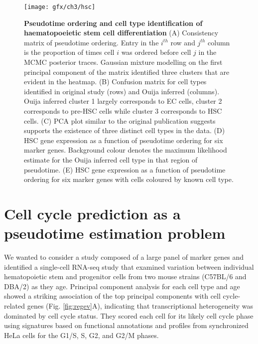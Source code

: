 \begin{figure}
	\centering
	\texttt{[image: gfx/ch3/hsc]}
	\caption{{\bf Pseudotime ordering and cell type identification of haematopoeietic stem cell differentiation}
(A) Consistency matrix of pseudotime ordering. Entry in the $i^{th}$ row and $j^{th}$ column is the proportion of times cell $i$ was ordered before cell $j$ in the MCMC posterior traces. Gaussian mixture modelling on the first principal component of the matrix identified three clusters that are evident in the heatmap.
(B) Confusion matrix for cell types identified in original study (rows) and Ouija inferred (columns). Ouija inferred cluster 1 largely corresponds to EC cells, cluster 2 corresponds to pre-HSC cells while cluster 3 corresponds to HSC cells.
(C) PCA plot similar to the original publication \cite{zhou2016tracing} suggests supports the existence of three distinct cell types in the data.
(D) HSC gene expression as a function of pseudotime ordering for six marker genes. Background colour denotes the maximum likelihood estimate for the Ouija inferred cell type in that region of pseudotime.
(E) HSC gene expression as a function of pseudotime ordering for six marker genes with cells coloured by known cell type.
}
	\label{fig:hsc}
\end{figure}


\section{Cell cycle prediction as a pseudotime estimation problem}

We wanted to consider a study composed of a large panel of marker genes and identified a single-cell RNA-seq study \cite{kowalczyk2015single} that examined variation between individual hematopoietic stem and progenitor cells from two mouse strains (C57BL/6 and DBA/2) as they age. Principal component analysis for each cell type and age showed a striking association of the top principal components with cell cycle-related genes (Fig. \ref{fig:regev}A), indicating that transcriptional heterogeneity was dominated by cell cycle status. They scored each cell for its likely cell cycle phase using signatures based on functional annotations \cite{reference2009gene} and profiles from synchronized HeLa cells\cite{whitfield2002identification} for the G1/S, S, G2, and G2/M phases.

